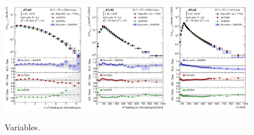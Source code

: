 \begin{figure}[tp]
  \centering
  \includegraphics[width=0.32\textwidth]{figures/STDM-2012-04/fig_11a}
  \includegraphics[width=0.32\textwidth]{figures/STDM-2012-04/fig_11b}
  \includegraphics[width=0.32\textwidth]{figures/STDM-2012-04/fig_15a}
  \caption{Variables.}
  \label{fig:backgrounds-zjj}
\end{figure}

